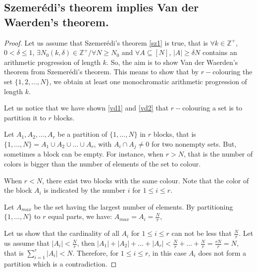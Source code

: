 \subsection{Szemerédi's theorem implies Van der Waerden's theorem.} \label{vsz}

\begin{proof}
  Let us assume that Szemerédi's theorem \eqref{sz1} is true, that is $\forall k \in \mathbb{Z}^+$, $0< \delta \leq  1$, $\exists N_0(k,\delta) \in \mathbb{Z}^+/ \forall N \geq N_0$ and $ \forall A \subseteq [N]$, $|A|\geq \delta N$ contains an arithmetic progression of length $k.$ So, the aim is to show  Van der Waerden's theorem from Szemerédi's theorem. This means to  show that by $r-$colouring the set $\{1,2,\ldots, N\}$, we obtain at least one monochromatic arithmetic progression of length $k.$
  
   Let us notice that we have shown \eqref{vd1} and \eqref{vd2} that $r-$colouring a set  is to partition it to $r$ blocks.

   Let $A_1,A_2, \ldots, A_r$ be a partition of $\{1, \ldots, N\}$ in $r$ blocks, that is $ \{1, \ldots, N\} =A_1 \cup A_2 \cup \ldots \cup A_r$, with $A_i \cap A_j \neq 0$ for two nonempty sets. 
   But, sometimes a block can be empty. For instance, when $r >N$, that is the number of colors is bigger than the number of elements of the set to colour.
  
   When $r <N$, there exist two blocks with the same colour.
   Note that the color of the block $A_i$ is indicated  by the number $i$  for $1\leq i \leq r.$ 

  Let $A_{max}$ be the set having the largest number of elements. By partitioning $\{1, \ldots, N\}$ to $r$ equal parts, we have: $A_{max}=A_i=\frac{N}{r}$,

  Let us show that the cardinality of all $A_i$  for $1\leq i \leq r$ can not be less that $\frac{N}{r}$.
  Let us assume that  $|A_i| < \frac{N}{r}$,  then $|A_1|+|A_2|+ \ldots +|A_r| < \frac{N}{r}+\ldots +\frac{N}{r}=\frac{rN}{r}=N$,
 that is $\displaystyle{ \sum_{i=1}^{r}|A_i|<N}$. Therefore, for $1\leq i \leq r$, in this case $A_i$ does not form a partition which is a contradiction.


\end{proof}
